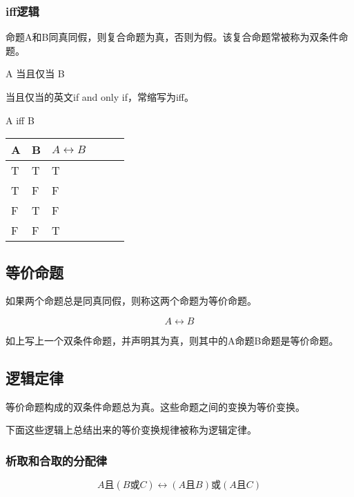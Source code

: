 \documentclass[12pt,oneside]{book}
\begin{document}
\subsubsection{iff逻辑}
命题A和B同真同假，则复合命题为真，否则为假。该复合命题常被称为双条件命题。

\begin{framed}
A 当且仅当 B
\end{framed}

当且仅当的英文if and only if，常缩写为iff。
\begin{framed}
A iff B
\end{framed}

\begin{table}[H]
\begin{tabular}{@{}llllll@{}}
\toprule
{A} & {B}  & {$A \leftrightarrow B$} \\ \midrule
{T}          & {T}       & {T}   \\
{T}          & {F}       & {F}   \\
{F}          & {T}        & {F}   \\
{F}          & {F}       & {T}   \\ \bottomrule
\end{tabular}
\end{table}

\subsection{等价命题}
如果两个命题总是同真同假，则称这两个命题为等价命题。

\begin{equation*}
A \leftrightarrow B
\end{equation*}

如上写上一个双条件命题，并声明其为真，则其中的A命题B命题是等价命题。


\subsection{逻辑定律}
等价命题构成的双条件命题总为真。这些命题之间的变换为等价变换。

下面这些逻辑上总结出来的等价变换规律被称为逻辑定律。

\subsubsection{析取和合取的分配律}
\begin{equation}
A \text{且} (B \text{或} C) \leftrightarrow (A \text{且} B) \text{或} (A \text{且} C)
\end{equation}
\end{document}
